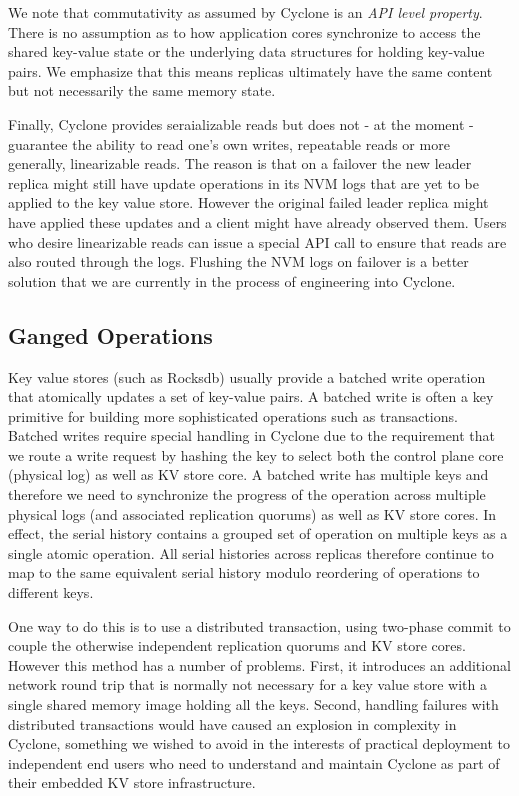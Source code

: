 \documentclass[10pt, preprint, nonatbib]{sigplanconf}
\begin{document}
We note that commutativity as assumed by Cyclone is an \emph{API level
  property}. There is no assumption as to how application cores synchronize to
access the shared key-value state or the underlying data structures for holding
key-value pairs. We emphasize that this means replicas ultimately have the same
content but not necessarily the same memory state.

Finally, Cyclone provides seraializable reads but does not - at the moment -
guarantee the ability to read one's own writes, repeatable reads or more
generally, linearizable reads. The reason is that on a failover the new leader
replica might still have update operations in its NVM logs that are yet to be
applied to the key value store. However the original failed leader replica might
have applied these updates and a client might have already observed them. Users
who desire linearizable reads can issue a special API call to ensure that reads
are also routed through the logs. Flushing the NVM logs on failover is a better
solution that we are currently in the process of engineering into Cyclone.

\subsection{Ganged Operations}
Key value stores (such as Rocksdb) usually provide a batched write operation
that atomically updates a set of key-value pairs. A batched write is often a key
primitive for building more sophisticated operations such as
transactions. Batched writes require special handling in Cyclone due to the
requirement that we route a write request by hashing the key to select both the
control plane core (physical log) as well as KV store core. A batched write has
multiple keys and therefore we need to synchronize the progress of the operation
across multiple physical logs (and associated replication quorums) as well as KV
store cores. In effect, the serial history contains a grouped set of operation
on multiple keys as a single atomic operation. All serial histories across
replicas therefore continue to map to the same equivalent serial history modulo
reordering of operations to different keys.

One way to do this is to use a distributed transaction, using
two-phase commit to couple the otherwise independent replication quorums and KV
store cores. However this method has a number of problems. First, it introduces
an additional network round trip that is normally not necessary for a key value
store with a single shared memory image holding all the keys. Second, handling
failures with distributed transactions would have caused an explosion in
complexity in Cyclone, something we wished to avoid in the interests of
practical deployment to independent end users who need to understand and 
maintain Cyclone as part of their embedded KV store infrastructure.
\end{document}
